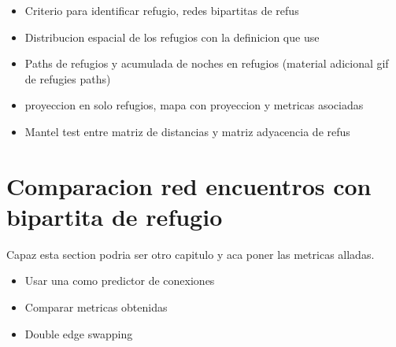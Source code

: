 \begin{itemize}
    \item Criterio para identificar refugio, redes bipartitas de refus
    \item Distribucion espacial de los refugios con la definicion que use
    \item Paths de refugios y acumulada de noches en refugios (material adicional gif de refugies paths)
    \item proyeccion en solo refugios, mapa con proyeccion y metricas asociadas 
    \item Mantel test entre matriz de distancias y matriz adyacencia de refus 
\end{itemize}
\section{Comparacion red encuentros con bipartita de refugio}
Capaz esta section podria ser otro capitulo y aca poner las metricas alladas.
\begin{itemize}
    \item Usar una como predictor de conexiones 
    \item Comparar metricas obtenidas 
    \item Double edge swapping 
\end{itemize}